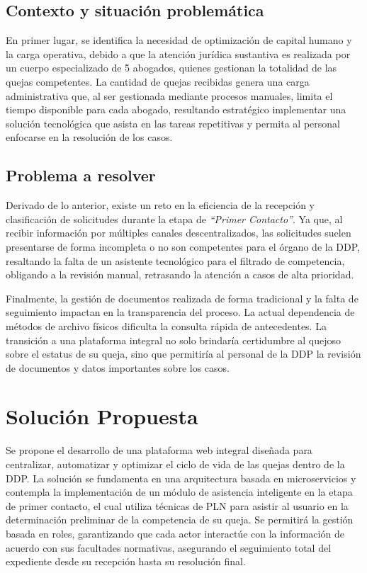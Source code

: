 \subsection{Contexto y situación problemática}
En primer lugar, se identifica la necesidad de optimización de capital humano y la carga operativa, debido a que la atención jurídica sustantiva es realizada por un cuerpo especializado de 5 abogados, quienes gestionan la totalidad de las quejas competentes. La cantidad de quejas recibidas genera una carga administrativa que, al ser gestionada mediante procesos manuales, limita el tiempo disponible para cada abogado, resultando estratégico implementar una solución tecnológica que asista en las tareas repetitivas y permita al personal enfocarse en la resolución de los casos.

\subsection{Problema a resolver}
Derivado de lo anterior, existe un reto en la eficiencia de la recepción y clasificación de solicitudes durante la etapa de \textit{``Primer Contacto''}. Ya que, al recibir información por múltiples canales descentralizados, las solicitudes suelen presentarse de forma incompleta o no son competentes para el órgano de la DDP, resaltando la falta de un asistente tecnológico para el filtrado de competencia, obligando a la revisión manual, retrasando la atención a casos de alta prioridad.

Finalmente, la gestión de documentos realizada de forma tradicional y la falta de seguimiento impactan en la transparencia del proceso. La actual dependencia de métodos de archivo físicos dificulta la consulta rápida de antecedentes. La transición a una plataforma integral no solo brindaría certidumbre al quejoso sobre el estatus de su queja, sino que permitiría al personal de la DDP la revisión de documentos y datos importantes sobre los casos.

\section{Solución Propuesta}
Se propone el desarrollo de una plataforma web integral diseñada para centralizar, automatizar y optimizar el ciclo de vida de las quejas dentro de la DDP. La solución se fundamenta en una arquitectura basada en microservicios y contempla la implementación de un módulo de asistencia inteligente en la etapa de primer contacto, el cual utiliza técnicas de PLN para asistir al usuario en la determinación preliminar de la competencia de su queja. Se permitirá la gestión basada en roles, garantizando que cada actor interactúe con la información de acuerdo con sus facultades normativas, asegurando el seguimiento total del expediente desde su recepción hasta su resolución final.

